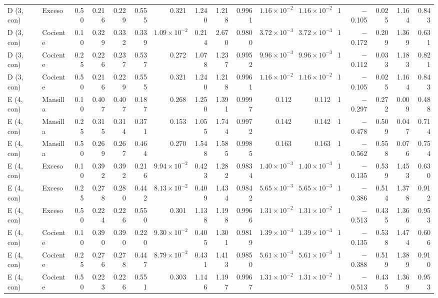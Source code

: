 \documentclass[11pt,letterpaper]{article}
\begin{document}
\begin{landscape}
\begin{scriptsize}
\begin{longtable}{llrrrrrrrrrrrrrrr}
D (3, con) & Exceso & 0.50 & 0.216 & 0.229 & 0.555 & 0.321 & 1.240 & 1.218 & 0.9961 & $1.16\times10^{-2}$ & $1.16\times10^{-2}$ & 1 & $-$0.105 & 0.025 & 1.164 & 0.843 \\
D (3, con) & Cociente & 0.10 & 0.329 & 0.332 & 0.339 & $1.09\times10^{-2}$ & 0.214 & 2.670 & 0.9800 & $3.72\times10^{-3}$ & $3.72\times10^{-3}$ & 1 & $-$0.172 & 0.209 & 1.369 & 0.631 \\
D (3, con) & Cociente & 0.25 & 0.226 & 0.237 & 0.537 & 0.272 & 1.078 & 1.237 & 0.9952 & $9.96\times10^{-3}$ & $9.96\times10^{-3}$ & 1 & $-$0.112 & 0.033 & 1.183 & 0.821 \\
D (3, con) & Cociente & 0.50 & 0.216 & 0.229 & 0.555 & 0.321 & 1.240 & 1.218 & 0.9961 & $1.16\times10^{-2}$ & $1.16\times10^{-2}$ & 1 & $-$0.105 & 0.025 & 1.164 & 0.843 \\
E (4, con) & Mansilla & 0.10 & 0.407 & 0.407 & 0.187 & 0.268 & 1.250 & 1.391 & 0.9997 & 0.112 & 0.112 & 1 & $-$0.297 & 0.272 & 0.009 & 0.488 \\
E (4, con) & Mansilla & 0.25 & 0.315 & 0.314 & 0.371 & 0.153 & 1.055 & 1.744 & 0.9972 & 0.142 & 0.142 & 1 & $-$0.478 & 0.509 & 0.047 & 0.714 \\
E (4, con) & Mansilla & 0.50 & 0.269 & 0.267 & 0.464 & 0.270 & 1.548 & 1.585 & 0.9985 & 0.163 & 0.163 & 1 & $-$0.562 & 0.558 & 0.076 & 0.754 \\
E (4, con) & Exceso & 0.10 & 0.392 & 0.392 & 0.216 & $9.94\times10^{-2}$ & 0.423 & 1.282 & 0.9834 & $1.40\times10^{-3}$ & $1.40\times10^{-3}$ & 1 & $-$0.135 & 0.539 & 1.453 & 0.630 \\
E (4, con) & Exceso & 0.25 & 0.278 & 0.280 & 0.442 & $8.13\times10^{-2}$ & 0.409 & 1.434 & 0.9842 & $5.65\times10^{-3}$ & $5.65\times10^{-3}$ & 1 & $-$0.386 & 0.514 & 1.378 & 0.912 \\
E (4, con) & Exceso & 0.50 & 0.224 & 0.226 & 0.550 & 0.301 & 1.138 & 1.198 & 0.9966 & $1.31\times10^{-2}$ & $1.31\times10^{-2}$ & 1 & $-$0.513 & 0.435 & 1.366 & 0.953 \\
E (4, con) & Cociente & 0.10 & 0.390 & 0.390 & 0.220 & $9.30\times10^{-2}$ & 0.405 & 1.301 & 0.9819 & $1.39\times10^{-3}$ & $1.39\times10^{-3}$ & 1 & $-$0.135 & 0.538 & 1.474 & 0.606 \\
E (4, con) & Cociente & 0.25 & 0.276 & 0.278 & 0.447 & $8.79\times10^{-2}$ & 0.431 & 1.413 & 0.9850 & $5.61\times10^{-3}$ & $5.61\times10^{-3}$ & 1 & $-$0.388 & 0.519 & 1.389 & 0.910 \\
E (4, con) & Cociente & 0.50 & 0.223 & 0.226 & 0.551 & 0.303 & 1.146 & 1.197 & 0.9967 & $1.31\times10^{-2}$ & $1.31\times10^{-2}$ & 1 & $-$0.513 & 0.435 & 1.369 & 0.953 \\

\end{longtable}
\end{scriptsize}
\end{landscape}
\end{document}
